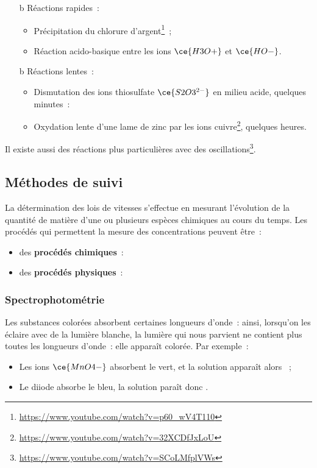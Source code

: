 \documentclass[../../main/main.tex]{subfiles}
\begin{document}
\begin{itemize}
	\item[b]{Réactions rapides}~:
	      \begin{itemize}
		      \item Précipitation du chlorure
		            d'argent\footnote{\label{fn:vid1}\url{https://www.youtube.com/watch?v=p60\_wV4T110}}~;
		      \item Réaction acido-basique entre les ions $\ce{H3O+}$ et
		            $\ce{HO-}$.
	      \end{itemize}
	\item[b]{Réactions lentes}~:
	      \begin{itemize}
		      \item Dismutation des ions thiosulfate $\ce{S2O3^{2-}}$ en
		            milieu acide, quelques minutes~:
		      \item Oxydation lente d'une lame de zinc par les ions
		            cuivre\footnote{\url{https://www.youtube.com/watch?v=32XCDfJxLoU}},
		            quelques heures.
	      \end{itemize}
\end{itemize}
Il existe aussi des réactions plus particulières avec des
oscillations\footnote{\url{https://www.youtube.com/watch?v=SCoLMfplVWs}}.

\subsection{Méthodes de suivi}

La détermination des lois de vitesses s'effectue en mesurant l'évolution de la
quantité de matière d'une ou plusieurs espèces chimiques au cours du temps. Les
procédés qui permettent la mesure des concentrations peuvent être~:

\begin{itemize}
	\item des \textbf{procédés chimiques}~:
	\item des \textbf{procédés physiques}~:
\end{itemize}

\subsubsection{Spectrophotométrie}
Les substances colorées absorbent certaines longueurs d'onde~: ainsi, lorsqu'on
les éclaire avec de la lumière blanche, la lumière qui nous parvient ne contient
plus toutes les longueurs d'onde~: elle apparaît colorée. Par exemple~:
\begin{itemize}
	\item Les ions $\ce{MnO4-}$ absorbent le vert, et la solution apparaît alors
	      ~;
	\item Le diiode absorbe le bleu, la solution paraît donc .
\end{itemize}
\end{document}
